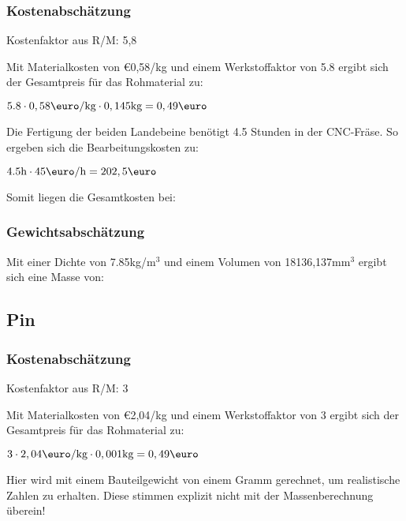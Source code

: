 \documentclass[10pt, a4paper]{article}
\begin{document}
\subsubsection{Kostenabschätzung}
\begin{center}
  Kostenfaktor aus R/M: 5,8
\end{center}
Mit Materialkosten von \euro0,58/kg und einem Werkstoffaktor von 5.8 ergibt sich der Gesamtpreis für das Rohmaterial zu: 
\begin{center}
    $5.8 \cdot 0,58\text{\euro/kg} \cdot 0,145\text{kg} = 0,49\text{\euro}$
\end{center}
Die Fertigung der beiden Landebeine benötigt 4.5 Stunden in der CNC-Fräse. So ergeben sich die Bearbeitungskosten zu:
\begin{center}
  $4.5\text{h} \cdot 45\text{\euro/h}= 202,5\text{\euro}$
\end{center}
Somit liegen die Gesamtkosten bei:
\begin{flushright}
\end{flushright}
\subsubsection{Gewichtsabschätzung}
Mit einer Dichte von 7.85kg/m$^3$ und einem Volumen von 18136,137mm$^3$ ergibt sich eine Masse von:
\begin{flushright}
\end{flushright}

\newpage
\subsection{Pin}
\begin{figure}[h]
  \centering
  \vspace{-10pt}
\end{figure}
\subsubsection{Kostenabschätzung}
\begin{center}
  Kostenfaktor aus R/M: 3
\end{center}
Mit Materialkosten von \euro2,04/kg und einem Werkstoffaktor von 3 ergibt sich der Gesamtpreis für das Rohmaterial zu: 
\begin{center}
    $3 \cdot 2,04\text{\euro/kg} \cdot 0,001\text{kg} = 0,49\text{\euro}$
\end{center}
Hier wird mit einem Bauteilgewicht von einem Gramm gerechnet, um realistische Zahlen zu erhalten. Diese stimmen explizit nicht mit der Massenberechnung überein!
\end{document}
